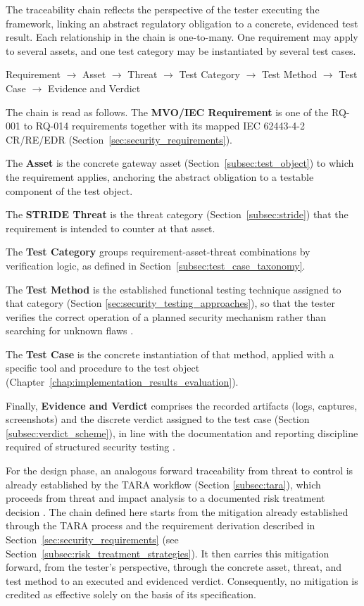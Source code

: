 The traceability chain reflects the perspective of the tester executing the framework, linking an abstract regulatory obligation to a concrete, evidenced test result. Each relationship in the chain is one-to-many. One requirement may apply to several assets, and one test category may be instantiated by several test cases.

Requirement $\rightarrow$ Asset $\rightarrow$ Threat $\rightarrow$ Test Category $\rightarrow$ Test Method $\rightarrow$ Test Case $\rightarrow$ Evidence and Verdict

The chain is read as follows. 
The \textbf{MVO/IEC Requirement} is one of the RQ-001 to RQ-014 requirements together with its mapped IEC 62443-4-2 CR/RE/EDR (Section~\ref{sec:security_requirements}).
 
The \textbf{Asset} is the concrete gateway asset (Section~\ref{subsec:test_object}) to which the requirement applies, anchoring the abstract obligation to a testable component of the test object. 

The \textbf{STRIDE Threat} is the threat category (Section~\ref{subsec:stride}) that the requirement is intended to counter at that asset. 

The \textbf{Test Category} groups requirement-asset-threat combinations by verification logic, as defined in Section~\ref{subsec:test_case_taxonomy}. 

The \textbf{Test Method} is the established functional testing technique assigned to that category (Section \ref{sec:security_testing_approaches}), so that the tester verifies the correct operation of a planned security mechanism rather than searching for unknown flaws \cite[p. 82]{1341418}. 

The \textbf{Test Case} is the concrete instantiation of that method, applied with a specific tool and procedure to the test object (Chapter~\ref{chap:implementation_results_evaluation}). 

Finally, \textbf{Evidence and Verdict} comprises the recorded artifacts (logs, captures, screenshots) and the discrete verdict assigned to the test case (Section \ref{subsec:verdict_scheme}), in line with the documentation and reporting discipline required of structured security testing \cite[p. 7-3, p. 7-5]{nist_sp800_115}.

For the design phase, an analogous forward traceability from threat to control is already established by the TARA workflow (Section \ref{subsec:tara}), which proceeds from threat and impact analysis to a documented risk treatment decision \cite[pp. 46]{doCarmo2025}. 
The chain defined here starts from the mitigation already established through the TARA process and the requirement derivation described in Section~\ref{sec:security_requirements} (see Section~\ref{subsec:risk_treatment_strategies}). It then carries this mitigation forward, from the tester's perspective, through the concrete asset, threat, and test method to an executed and evidenced verdict. Consequently, no mitigation is credited as effective solely on the basis of its specification.

